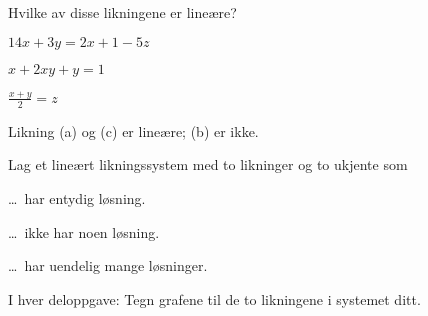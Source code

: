 
\begin{oppgave}
Hvilke av disse likningene er lineære?
\begin{punkt}
$14x + 3y = 2x + 1 - 5z$
\end{punkt}
\begin{punkt}
$x + 2xy + y = 1$
\end{punkt}
\begin{punkt}
$\frac{x + y}{2} = z$
\end{punkt}
\end{oppgave}

\begin{losning}
Likning (a) og (c) er lineære; (b) er ikke.
\end{losning}


\begin{oppgave}
Lag et lineært likningssystem med to likninger og to ukjente som
\begin{punkt}
\ldots\ har entydig løsning.
\end{punkt}
\begin{punkt}
\ldots\ ikke har noen løsning.
\end{punkt}
\begin{punkt}
\ldots\ har uendelig mange løsninger.
\end{punkt}
\smallskip\noindent
I hver deloppgave: Tegn grafene til de to likningene i systemet ditt.
\end{oppgave}

